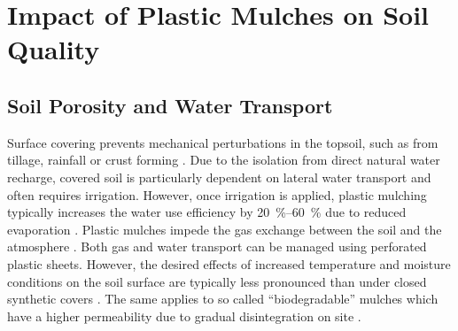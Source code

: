 \section{Impact of Plastic Mulches on Soil Quality}
\label{sec:plastic-mulching:soil-quality}

\subsection{Soil Porosity and Water Transport}

Surface covering prevents mechanical perturbations in the topsoil, such as from tillage, rainfall or crust forming \citep{KhanSoil2000,SubrahmaniyanCrop2006}. Due to the isolation from direct natural water recharge, covered soil is particularly dependent on lateral water transport \citep{LiOpenHole2003} and often requires irrigation. However, once
irrigation is applied, plastic mulching typically increases the water use efficiency by \SIrange{20}{60}{\percent} due to reduced evaporation \citep{QinSoil2015,ZribiEfficiency2015}. Plastic mulches impede the gas exchange between the soil and the atmosphere \citep{KhanSoil2000}. Both gas and water transport can be managed using perforated plastic sheets.
However, the desired effects of increased temperature and moisture conditions on the soil surface are typically less pronounced than under closed synthetic covers \citep{LiOpenHole2003}. The same applies to so called ``biodegradable'' mulches which have a higher permeability due to gradual disintegration on site \citep{MorenoEffect2008}.

